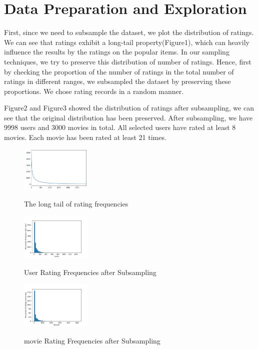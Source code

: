 \documentclass[12pt,journal,compsoc]{IEEEtran}
\begin{document}
\section{Data Preparation and Exploration}
First, since we need to subsample the dataset, we plot the distribution of ratings. We can see that ratings exhibit a long-tail property(Figure1), which can heavily influence the results by the ratings on the popular items. In our sampling techniques, we try to preserve this distribution of number of ratings. Hence, first by checking the proportion of the number of ratings in the total number of ratings in different ranges, we subsampled the dataset by preserving these proportions. We chose rating records in a random manner. 

Figure2 and Figure3 showed the distribution of ratings after subsampling, we can see that the original distribution has been preserved. After subsampling, we have 9998 users and 3000 movies in total. All selected users have rated at least 8 movies. Each movie has been rated at least 21 times. 

\begin{figure}[H]
\centering
\caption{The long tail of rating frequencies}
\includegraphics[width=0.30\textwidth]{img/longtail.png}
\label{fig_sim}
\end{figure}

\begin{figure}[H]
\centering
\caption{User Rating Frequencies after Subsampling}
\includegraphics[width=0.30\textwidth]{img/User.jpg}
\label{fig_sim}
\end{figure}

\begin{figure}[H]
\centering
\caption{movie Rating Frequencies after Subsampling}
\includegraphics[width=0.30\textwidth]{img/movie.jpg}
\label{fig_sim}
\end{figure}
\end{document}
